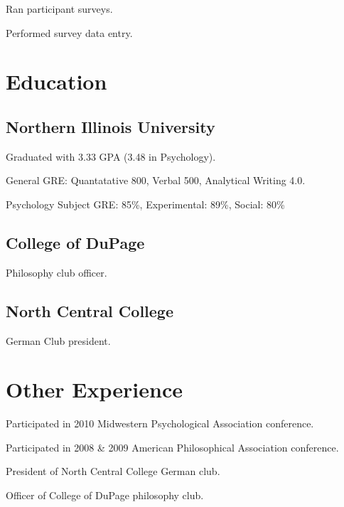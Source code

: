 \documentclass{resume}
\begin{document}
\begin{compactitem}
  \item Ran participant surveys.
  \item Performed survey data entry.
\end{compactitem}

\section{Education}

\subsection{Northern Illinois University}

\begin{compactitem}
  \item Graduated with 3.33 GPA (3.48 in Psychology).
  \item General GRE: Quantatative 800, Verbal 500, Analytical Writing 4.0.
  \item Psychology Subject GRE: 85\%, Experimental: 89\%, Social: 80\%
\end{compactitem}

\subsection{College of DuPage}
\begin{compactitem}
  \item Philosophy club officer.
\end{compactitem}

\subsection{North Central College}
\begin{compactitem}
  \item German Club president.
\end{compactitem}

\section{Other Experience}

\begin{compactitem}
  \item Participated in 2010 Midwestern Psychological Association conference.
  \item Participated in 2008 \& 2009 American Philosophical Association conference.
  \item President of North Central College German club.
  \item Officer of College of DuPage philosophy club.
\end{compactitem}
\end{document}
